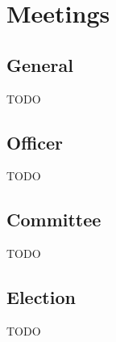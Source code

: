 \chapter{Meetings}

\section{General}\label{sec:general_meetings}
TODO

\section{Officer}\label{sec:officer_meetings}
TODO

\section{Committee}\label{sec:committee_meetings}
TODO

\section{Election}\label{sec:election_meeting}
TODO
